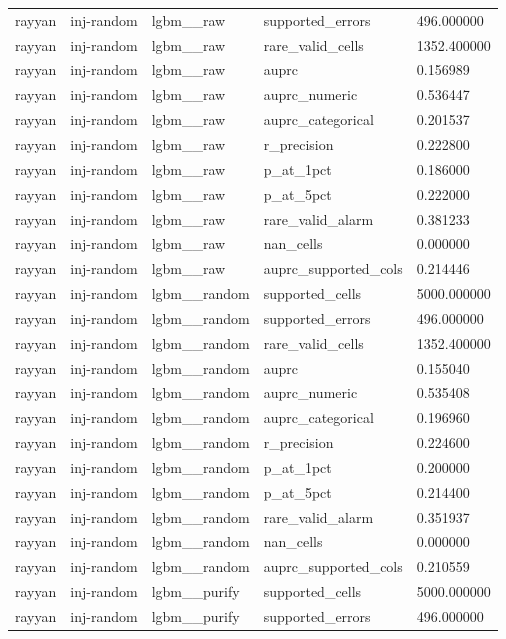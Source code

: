 \begin{tabular}{lllll}
rayyan & inj-random & lgbm\_\_raw & supported\_errors & 496.000000 \\
rayyan & inj-random & lgbm\_\_raw & rare\_valid\_cells & 1352.400000 \\
rayyan & inj-random & lgbm\_\_raw & auprc & 0.156989 \\
rayyan & inj-random & lgbm\_\_raw & auprc\_numeric & 0.536447 \\
rayyan & inj-random & lgbm\_\_raw & auprc\_categorical & 0.201537 \\
rayyan & inj-random & lgbm\_\_raw & r\_precision & 0.222800 \\
rayyan & inj-random & lgbm\_\_raw & p\_at\_1pct & 0.186000 \\
rayyan & inj-random & lgbm\_\_raw & p\_at\_5pct & 0.222000 \\
rayyan & inj-random & lgbm\_\_raw & rare\_valid\_alarm & 0.381233 \\
rayyan & inj-random & lgbm\_\_raw & nan\_cells & 0.000000 \\
rayyan & inj-random & lgbm\_\_raw & auprc\_supported\_cols & 0.214446 \\
rayyan & inj-random & lgbm\_\_random & supported\_cells & 5000.000000 \\
rayyan & inj-random & lgbm\_\_random & supported\_errors & 496.000000 \\
rayyan & inj-random & lgbm\_\_random & rare\_valid\_cells & 1352.400000 \\
rayyan & inj-random & lgbm\_\_random & auprc & 0.155040 \\
rayyan & inj-random & lgbm\_\_random & auprc\_numeric & 0.535408 \\
rayyan & inj-random & lgbm\_\_random & auprc\_categorical & 0.196960 \\
rayyan & inj-random & lgbm\_\_random & r\_precision & 0.224600 \\
rayyan & inj-random & lgbm\_\_random & p\_at\_1pct & 0.200000 \\
rayyan & inj-random & lgbm\_\_random & p\_at\_5pct & 0.214400 \\
rayyan & inj-random & lgbm\_\_random & rare\_valid\_alarm & 0.351937 \\
rayyan & inj-random & lgbm\_\_random & nan\_cells & 0.000000 \\
rayyan & inj-random & lgbm\_\_random & auprc\_supported\_cols & 0.210559 \\
rayyan & inj-random & lgbm\_\_purify & supported\_cells & 5000.000000 \\
rayyan & inj-random & lgbm\_\_purify & supported\_errors & 496.000000 \\

\end{tabular}
